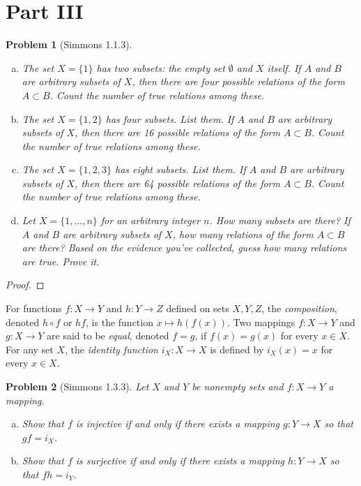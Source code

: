 \documentclass[11pt]{article}
\newtheorem{problem}{Problem}
\theoremstyle{definition}
\theoremstyle{case}
\begin{document}
\section{Part III}



\begin{problem}[Simmons 1.1.3]
\begin{enumerate}[(a)]
\item The set $X=\{1\}$ has two subsets: the empty set $\emptyset$ and $X$ itself. If $A$ and $B$ are arbitrary subsets of $X$, then there are four possible relations of the form $A\subset B$. Count the number of true relations among these. 
\item The set $X=\{1,2\}$ has four subsets. List them. If $A$ and $B$ are arbitrary subsets of $X$, then there are 16 possible relations of the form $A\subset B$. Count the number of true relations among these. 
\item The set $X=\{1,2,3\}$ has eight subsets. List them. If $A$ and $B$ are arbitrary subsets of $X$, then there are 64 possible relations of the form $A\subset B$. Count the number of true relations among these. 
\item Let $X=\{1,\ldots,n\}$ for an arbitrary integer $n$. How many subsets are there? If $A$ and $B$ are arbitrary subsets of $X$, how many relations of the form $A\subset B$ are there? Based on the evidence you've collected, guess how many relations are true. Prove it. 
\end{enumerate}
\end{problem}

\begin{proof}
\end{proof}

For functions $f:X\rightarrow Y$ and $h:Y\rightarrow Z$ defined on sets $X,Y,Z$, the \emph{composition}, denoted $h\circ f$ or $hf$, is the function $x\mapsto h(f(x))$. Two mappings $f:X\rightarrow Y$ and $g:X\rightarrow Y$ are said to be \emph{equal}, denoted $f=g$, if $f(x)=g(x)$ for every $x\in X$. For any set $X$, the \emph{identity function} $i_X:X\rightarrow X$ is defined by $i_X(x)=x$ for every $x\in X$.


\begin{problem}[Simmons 1.3.3]
Let $X$ and $Y$ be nonempty sets and $f:X\rightarrow Y$ a mapping. 
\begin{enumerate}[(a)]
\item Show that $f$ is injective if and only if there exists a mapping $g:Y\rightarrow X$ so that $gf=i_X$. 
\item Show that $f$ is surjective if and only if there exists a mapping $h:Y\rightarrow X$ so that $fh=i_Y$. 
\end{enumerate}
\end{problem} 
\end{document}
